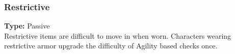 \subsubsection{Restrictive}
\label{iqty:restrictive}
\textbf{Type:} Passive\\
Restrictive items are difficult to move in
when worn. Characters wearing restrictive armor
upgrade the difficulty of Agility based checks once.

